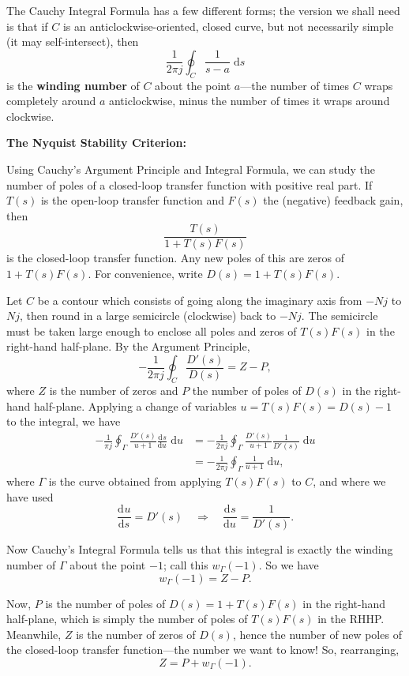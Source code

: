 \documentclass{article}
\newcommand{\deriv}[3][]{\frac{\mathrm{d}^{#1}#2}{\mathrm{d}#3^{#1}}}
\newcommand{\diff}{\;\mathrm{d}}
\begin{document}
\vfill


The Cauchy Integral Formula has a few different forms; the version we shall need is that if $C$ is an anticlockwise-oriented, closed curve, but not necessarily simple (it may self-intersect), then
\[\frac{1}{2\pi j}\oint_C \frac{1}{s-a}\diff s\]
is the \textbf{winding number} of $C$ about the point $a$---the number of times $C$ wraps completely around $a$ anticlockwise, minus the number of times it wraps around clockwise.





\clearpage



\textbf{The Nyquist Stability Criterion:}\bigskip


Using Cauchy's Argument Principle and Integral Formula, we can study the number of poles of a closed-loop transfer function with positive real part. If $T(s)$ is the open-loop transfer function and $F(s)$ the (negative) feedback gain, then
\[\frac{T(s)}{1+T(s)F(s)}\]
is the closed-loop transfer function. Any new poles of this are zeros of $1+T(s)F(s)$. For convenience, write $D(s)=1+T(s)F(s)$.

Let $C$ be a contour which consists of going along the imaginary axis from $-Nj$ to $Nj$, then round in a large semicircle (clockwise) back to $-Nj$. The semicircle must be taken large enough to enclose all poles and zeros of $T(s)F(s)$ in the right-hand half-plane. By the Argument Principle,
\[-\frac{1}{2\pi j}\oint_C \frac{D'(s)}{D(s)}=Z-P,\]
where $Z$ is the number of zeros and $P$ the number of poles of $D(s)$ in the right-hand half-plane. Applying a change of variables $u=T(s)F(s)=D(s)-1$ to the integral, we have
\begin{align*}
	-\frac{1}{\pi j}\oint_{\Gamma} \frac{D'(s)}{u+1}\deriv{s}{u}\diff u&=-\frac{1}{2\pi j}\oint_\Gamma \frac{D'(s)}{u+1}\frac{1}{D'(s)}\diff u\\
	&=-\frac{1}{2\pi j}\oint_\Gamma \frac{1}{u+1}\diff u,
\end{align*}
where $\Gamma$ is the curve obtained from applying $T(s)F(s)$ to $C$, and where we have used
\[\deriv{u}{s}=D'(s)\quad \Rightarrow\quad \deriv{s}{u}=\frac{1}{D'(s)}.\]

Now Cauchy's Integral Formula tells us that this integral is exactly the winding number of $\Gamma$ about the point $-1$; call this $w_\Gamma(-1)$. So we have
\[w_\Gamma(-1)=Z-P.\]

Now, $P$ is the number of poles of $D(s)=1+T(s)F(s)$ in the right-hand half-plane, which is simply the number of poles of $T(s)F(s)$ in the RHHP. Meanwhile, $Z$ is the number of zeros of $D(s)$, hence the number of new poles of the closed-loop transfer function---the number we want to know! So, rearranging,
\[Z=P+w_\Gamma(-1).\]
\end{document}
